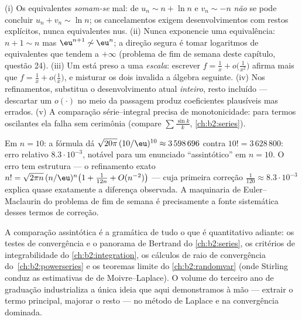 \begin{remark}\label{rem:b2:comparison:pitfalls}
(i) Os equivalentes \emph{somam-se} mal: de $u_n \sim n + \ln n$ e
$v_n \sim -n$ \emph{não} se pode concluir $u_n + v_n \sim \ln
n$; os cancelamentos exigem desenvolvimentos com restos explícitos,
nunca equivalentes nus. (ii) Nunca exponencie uma equivalência:
$n + 1 \sim n$ mas $\eu^{n+1} \not\sim \eu^n$; a direção
segura é tomar logaritmos de equivalentes que tendem a
$+\infty$ (problema de fim de semana deste capítulo, questão 24). (iii)
Um  está preso a uma \emph{escala}: escrever
$f = \frac1x + o\bigl(\frac1{x^2}\bigr)$ afirma mais que $f =
\frac1x + o\bigl(\frac1x\bigr)$, e misturar os dois invalida a
álgebra seguinte. (iv) Nos refinamentos, substitua o desenvolvimento
atual \emph{inteiro}, resto incluído --- descartar
um $o(\cdot)$ no meio da passagem produz coeficientes plausíveis mas
errados. (v) A comparação série--integral precisa de
monotonicidade: para termos oscilantes ela falha sem cerimônia (compare
$\sum\frac{\sin k}k$, \cref{ch:b2:series}).
\end{remark}

\begin{example}\label{ex:b2:comparison:stirlingnum}
Em $n = 10$: a fórmula dá $\sqrt{20\pi}\,(10/\eu)^{10}
\approx 3\,598\,696$ contra $10! = 3\,628\,800$: erro relativo
$8.3\cdot10^{-3}$, notável para um enunciado ``assintótico'' em
$n = 10$. O erro tem estrutura --- o refinamento exato $n!
= \sqrt{2\pi n}\,(n/\eu)^n\bigl(1 + \frac1{12n} +
O(n^{-2})\bigr)$ --- cuja primeira correção $\frac1{120} \approx
8.3\cdot10^{-3}$ explica quase exatamente a diferença observada. A
maquinaria de Euler--Maclaurin do problema de fim de semana é precisamente a
fonte sistemática desses termos de correção.
\end{example}

\begin{remark}
A comparação assintótica é a gramática de tudo o que é quantitativo
adiante: os testes de convergência e o panorama de Bertrand do
\cref{ch:b2:series}, os critérios de integrabilidade do
\cref{ch:b2:integration}, os cálculos de raio de convergência
do~\cref{ch:b2:powerseries} e os teoremas limite do
\cref{ch:b2:randomvar} (onde Stirling conduz as estimativas de de
Moivre--Laplace). O volume do terceiro ano de graduação industrializa a
única ideia que aqui demonstramos à mão --- extrair o termo principal, majorar
o resto --- no método de Laplace e na convergência dominada.
\end{remark}


